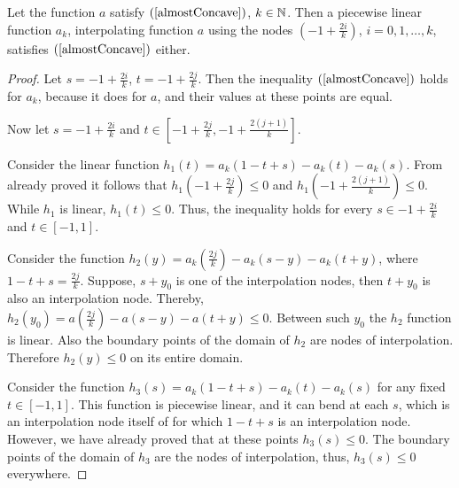 \begin{lm}
\label{piecewiseLinearConcave}
Let the function $a$ satisfy $(\ref{almostConcave})$, $k \in \mathbb N$.
Then a piecewise linear function $a_k$,
interpolating function $a$ using the nodes
$(-1 + \frac{2i}{k})$, $i = 0, 1, \dots, k$,
satisfies $(\ref{almostConcave})$ either.
\end{lm}
\begin{proof}
Let $s = -1 + \frac{2i}{k}$, $t = -1 + \frac{2j}{k}$.
Then the inequality $(\ref{almostConcave})$ holds for $a_k$, because it does for $a$,
and their values at these points are equal.

Now let $s = -1 + \frac{2i}{k}$ and $t \in [-1 + \frac{2j}{k}, -1 + \frac{2(j + 1)}{k}]$.

Consider the linear function $h_1(t) = a_k( 1 - t + s ) - a_k(t) - a_k(s)$.
From already proved it follows that $h_1(-1 + \frac{2j}{k}) \le 0$ and $h_1(-1 + \frac{2(j + 1)}{k}) \le 0$.
While $h_1$ is linear, $h_1(t) \le 0$.
Thus, the inequality holds for every $s \in -1 + \frac{2i}{k}$ and $t \in [-1, 1]$.

Consider the function $h_2(y) = a_k(\frac{2j}{k}) - a_k(s - y) - a_k(t + y)$, where $1 - t + s = \frac{2j}{k}$.
Suppose, $s + y_0$ is one of the interpolation nodes, then $t + y_0$ is also an interpolation node.
Thereby, $h_2(y_0) = a(\frac{2j}{k}) - a(s - y) - a(t + y) \le 0$.
Between such $y_0$ the $h_2$ function is linear.
Also the boundary points of the domain of $h_2$ are nodes of interpolation.
Therefore $h_2(y) \le 0$ on its entire domain.

Consider the function $h_3(s) = a_k( 1 - t + s ) - a_k(t) - a_k(s)$ for any fixed $t \in [-1, 1]$.
This function is piecewise linear,
and it can bend at each $s$, which is an interpolation node itself of for which
$1 - t + s$ is an interpolation node.
However, we have already proved that at these points $h_3(s) \le 0$.
The boundary points of the domain of $h_3$ are the nodes of interpolation, thus, $h_3(s) \le 0$ everywhere.
\end{proof}

